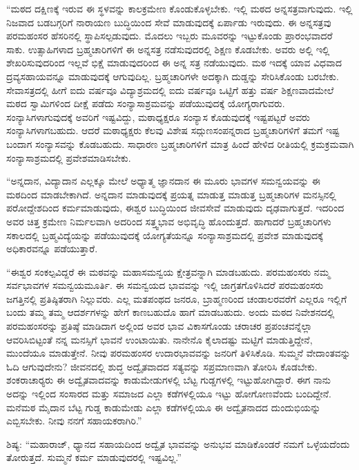  “ಮಠದ ದಕ್ಷಿಣಕ್ಕೆ ಇರುವ ಈ ಸ್ಥಳವನ್ನು ಕಾಲಕ್ರಮೇಣ ಕೊಂಡುಕೊಳ್ಳಬೇಕು. ಇಲ್ಲಿ ಮಠದ ಅನ್ನಸತ್ರವಾಗುವುದು. ಇಲ್ಲಿ ನಿಜವಾದ ಬಡಬಗ್ಗರಿಗೆ ನಾರಾಯಣ ಬುದ್ಧಿಯಿಂದ ಸೇವೆ ಮಾಡುವುದಕ್ಕೆ ಏರ್ಪಾಡು ಇರುವುದು. ಈ ಅನ್ನಸತ್ರವು ಪರಮಹಂಸರ ಹೆಸರಿನಲ್ಲಿ ಸ್ಥಾಪಿಸಲ್ಪಡುವುದು. ಮೊದಲು ಇಬ್ಬರು ಮೂವರನ್ನು ಇಟ್ಟುಕೊಂಡು ಪ್ರಾರಂಭವಾದರೆ ಸಾಕು. ಉತ್ಸಾಹಿಗಳಾದ ಬ್ರಹ್ಮಚಾರಿಗಳಿಗೆ ಈ ಅನ್ನಸತ್ರ ನಡೆಸುವುದರಲ್ಲಿ ಶಿಕ್ಷಣ ಕೊಡಬೇಕು. ಅವರು ಅಲ್ಲಿ ಇಲ್ಲಿ ಶೇಖರಿಸುವುದರಿಂದ ಇಲ್ಲವೆ ಭಿಕ್ಷೆ ಮಾಡುವುದರಿಂದ ಈ ಅನ್ನ ಸತ್ರ ನಡೆಯುವುದು. ಮಠ ಇದಕ್ಕೆ ಯಾವ ವಿಧವಾದ ದ್ರವ್ಯಸಹಾಯವನ್ನೂ ಮಾಡುವುದಕ್ಕೆ ಆಗುವುದಿಲ್ಲ. ಬ್ರಹ್ಮಚಾರಿಗಳೇ ಅದಕ್ಕಾಗಿ ದುಡ್ಡನ್ನು ಸೇರಿಸಿಕೊಂಡು ಬರಬೇಕು. ಸೇವಾಸತ್ರದಲ್ಲಿ ಹೀಗೆ ಐದು ವರ್ಷವೂ ವಿದ್ಯಾಶ್ರಮದಲ್ಲಿ ಐದು ವರ್ಷವೂ ಒಟ್ಟಿಗೆ ಹತ್ತು ವರ್ಷ ಶಿಕ್ಷಣವಾದಮೇಲೆ ಮಠದ ಸ್ವಾಮಿಗಳಿಂದ ದೀಕ್ಷೆ ಪಡೆದು ಸಂನ್ಯಾಸಾಶ್ರಮವನ್ನು ಪಡೆಯುವುದಕ್ಕೆ ಯೋಗ್ಯರಾಗುವರು. ಸಂನ್ಯಾಸಿಗಳಾಗುವುದಕ್ಕೆ ಅವರಿಗೆ ಇಷ್ಟವಿದ್ದು, ಮಠಾಧ್ಯಕ್ಷರೂ ಸಂನ್ಯಾಸ ಕೊಡುವುದಕ್ಕೆ ಇಷ್ಟಪಟ್ಟರೆ ಅವರು ಸಂನ್ಯಾಸಿಗಳಾಗಬಹುದು. ಆದರೆ ಮಠಾಧ್ಯಕ್ಷರು ಕೆಲವು ವಿಶೇಷ ಸದ್ಗುಣಸಂಪನ್ನರಾದ ಬ್ರಹ್ಮಚಾರಿಗಳಿಗೆ ತಮಗೆ ಇಷ್ಟ ಬಂದಾಗ ಸಂನ್ಯಾಸವನ್ನು ಕೊಡಬಹುದು. ಸಾಧಾರಣ ಬ್ರಹ್ಮಚಾರಿಗಳಿಗೆ ಮಾತ್ರ ಹಿಂದೆ ಹೇಳಿದ ರೀತಿಯಲ್ಲಿ ಕ್ರಮಕ್ರಮವಾಗಿ ಸಂನ್ಯಾಸಾಶ್ರಮದಲ್ಲಿ ಪ್ರವೇಶಮಾಡಿಸಬೇಕು. 

 “ಅನ್ನದಾನ, ವಿದ್ಯಾದಾನ ಎಲ್ಲಕ್ಕೂ ಮೇಲೆ ಅಧ್ಯಾತ್ಮ ಜ್ಞಾನದಾನ ಈ ಮೂರು ಭಾವಗಳ ಸಮನ್ವಯವನ್ನು ಈ ಮಠದಿಂದ ಮಾಡಬೇಕಾಗಿದೆ. ಅನ್ನದಾನ ಮಾಡುವುದಕ್ಕೆ ಪ್ರಯತ್ನ ಮಾಡುತ್ತ ಮಾಡುತ್ತ ಬ್ರಹ್ಮಚಾರಿಗಳ ಮನಸ್ಸಿನಲ್ಲಿ ಪರೋದ್ದೇಶದಿಂದ ಕರ್ಮಮಾಡುವುದು, ಈಶ್ವರ ಬುದ್ಧಿಯಿಂದ ಜೀವಸೇವೆ ಮಾಡುವುದು ದೃಢವಾಗುತ್ತದೆ. ಇದರಿಂದ ಅವರ ಚಿತ್ತ ಕ್ರಮೇಣ ನಿರ್ಮಲವಾಗಿ ಅದರಿಂದ ಸತ್ತ್ವಭಾವ ಅಭಿವೃದ್ಧಿ ಹೊಂದುತ್ತದೆ. ಹಾಗಾದರೆ ಬ್ರಹ್ಮಚಾರಿಗಳು ಸಕಾಲದಲ್ಲಿ ಬ್ರಹ್ಮವಿದ್ಯೆಯನ್ನು ಪಡೆಯುವುದಕ್ಕೆ ಯೋಗ್ಯತೆಯನ್ನೂ ಸಂನ್ಯಾಸಾಶ್ರಮದಲ್ಲಿ ಪ್ರವೇಶ ಮಾಡುವುದಕ್ಕೆ ಅಧಿಕಾರವನ್ನೂ ಪಡೆಯುತ್ತಾರೆ. 

 “ಈಶ್ವರ ಸಂಕಲ್ಪವಿದ್ದರೆ ಈ ಮಠವನ್ನು ಮಹಾಸಮನ್ವಯ ಕ್ಷೇತ್ರವನ್ನಾಗಿ ಮಾಡಬಹುದು. ಪರಮಹಂಸರು ನಮ್ಮ ಸರ್ವಭಾವಗಳ ಸಮನ್ವಯಮೂರ್ತಿ. ಈ ಸಮನ್ವಯದ ಭಾವವನ್ನು ಇಲ್ಲಿ ಜಾಗ್ರತಗೊಳಿಸಿದರೆ ಪರಮಹಂಸರು ಜಗತ್ತಿನಲ್ಲಿ ಪ್ರತಿಷ್ಠಿತರಾಗಿ ನಿಲ್ಲುವರು. ಎಲ್ಲ ಮತಪಂಥದ ಜನರೂ, ಬ್ರಾಹ್ಮಣರಿಂದ ಚಂಡಾಲರವರೆಗೆ ಎಲ್ಲರೂ ಇಲ್ಲಿಗೆ ಬಂದು ತಮ್ಮ ತಮ್ಮ ಆದರ್ಶಗಳನ್ನು ಹೇಗೆ ಕಾಣಬಹುದೊ ಹಾಗೆ ಮಾಡಬಹುದು. ಅಂದು ಮಠದ ನಿವೇಶನದಲ್ಲಿ ಪರಮಹಂಸರನ್ನು ಪ್ರತಿಷ್ಠೆ ಮಾಡಿದಾಗ ಅಲ್ಲಿಂದ ಅವರ ಭಾವ ವಿಕಾಸಗೊಂಡು ಚರಾಚರ ಪ್ರಪಂಚವನ್ನೆಲ್ಲಾ ಆವರಿಸಿಬಿಟ್ಟಂತೆ ನನ್ನ ಮನಸ್ಸಿಗೆ ಭಾವನೆ ಉಂಟಾಯಿತು. ನಾನೇನೊ ಕೈಲಾದಷ್ಟು ಮಟ್ಟಿಗೆ ಮಾಡುತ್ತಿದ್ದೇನೆ, ಮುಂದೆಯೂ ಮಾಡುತ್ತೇನೆ. ನೀವು ಪರಮಹಂಸರ ಉದಾರಭಾವವನ್ನು ಜನರಿಗೆ ತಿಳಿಸಿಕೊಡಿ. ಸುಮ್ಮನೆ ವೇದಾಂತವನ್ನು ಓದಿ ಆಗುವುದೇನು? ಜೀವನದಲ್ಲಿ ಶುದ್ಧ ಅದ್ವೈತವಾದದ ಸತ್ಯವನ್ನು ಸಪ್ರಮಾಣವಾಗಿ ತೋರಿಸಿ ಕೊಡಬೇಕು. ಶಂಕರಾಚಾರ‍್ಯರು ಈ ಅದ್ವೈತವಾದವನ್ನು ಕಾಡುಮೇಡುಗಳಲ್ಲಿ ಬೆಟ್ಟ ಗುಡ್ಡಗಳಲ್ಲಿ ಇಟ್ಟುಹೋಗಿದ್ದಾರೆ. ಈಗ ನಾನು ಅದನ್ನು ಇಲ್ಲಿಂದ ಸಂಸಾರದ ಮತ್ತು ಸಮಾಜದ ಎಲ್ಲಾ ಕಡೆಗಳಲ್ಲಿಯೂ ಇಟ್ಟು ಹೋಗೋಣವೆಂದು ಬಂದಿದ್ದೇನೆ. ಮನೆಮಠ ಮೈದಾನ ಬೆಟ್ಟ ಗುಡ್ಡ ಕಾಡುಮೇಡು ಎಲ್ಲಾ ಕಡೆಗಳಲ್ಲಿಯೂ ಈ ಅದ್ವೈತನಾದದ ದುಂದುಭಿಯನ್ನು ಎಬ್ಬಿಸಬೇಕು. ನೀವು ನನಗೆ ಸಹಾಯಕರಾಗಿರಿ.” 

 ಶಿಷ್ಯ: “ಮಹಾರಾಜ್, ಧ್ಯಾನದ ಸಹಾಯದಿಂದ ಅದ್ವೈತ ಭಾವವನ್ನು ಅನುಭವ ಮಾಡಿಕೊಂಡರೆ ನಮಗೆ ಒಳ್ಳೆಯದೆಂದು ತೋರುತ್ತದೆ. ಸುಮ್ಮನೆ ಕರ್ಮ ಮಾಡುವುದರಲ್ಲಿ ಇಷ್ಟವಿಲ್ಲ.” 

